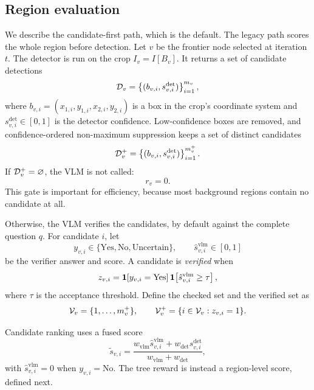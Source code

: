 \subsection{Region evaluation}

We describe the candidate-first path, which is the default. The legacy path
scores the whole region before detection. Let \(v\) be the frontier node
selected at iteration \(t\). The detector is run on the crop
\(I_v = I[B_v]\). It returns a set of candidate detections
\begin{equation}
  \mathcal{D}_v
  = \left\{ (b_{v,i}, s^{\mathrm{det}}_{v,i}) \right\}_{i=1}^{m_v},
\end{equation}
where \(b_{v,i}=(x_{1,i},y_{1,i},x_{2,i},y_{2,i})\) is a box in the crop's
coordinate system and \(s^{\mathrm{det}}_{v,i}\in[0,1]\) is the detector
confidence. Low-confidence boxes are removed, and confidence-ordered non-maximum
suppression keeps a set of distinct candidates
\begin{equation}
  \mathcal{D}^{+}_v
  = \left\{ (b_{v,i}, s^{\mathrm{det}}_{v,i}) \right\}_{i=1}^{m^{+}_v}.
\end{equation}
If \(\mathcal{D}^{+}_v=\varnothing\), the VLM is not called:
\begin{equation}
  r_v = 0.
  \label{eq:empty-region-reward}
\end{equation}
This gate is important for efficiency, because most background regions contain
no candidate at all.

Otherwise, the VLM verifies the candidates, by default against the complete
question \(q\). For candidate \(i\), let
\begin{equation}
  y_{v,i} \in \{\text{Yes}, \text{No}, \text{Uncertain}\},
  \qquad
  \hat{s}^{\mathrm{vlm}}_{v,i} \in [0,1]
\end{equation}
be the verifier answer and score. A candidate is \emph{verified} when
\begin{equation}
  z_{v,i}
  = \mathbf{1}\!\left[y_{v,i}=\text{Yes}\right]
    \mathbf{1}\!\left[\hat{s}^{\mathrm{vlm}}_{v,i} \ge \tau\right],
  \label{eq:verified}
\end{equation}
where \(\tau\) is the acceptance threshold. Define the checked set and the
verified set as
\begin{equation}
  \mathcal{V}_v = \{1,\ldots,m^{+}_v\},
  \qquad
  \mathcal{V}^{+}_v = \{ i \in \mathcal{V}_v : z_{v,i}=1 \}.
\end{equation}

Candidate ranking uses a fused score
\begin{equation}
  \tilde{s}_{v,i}
  = \frac{
      w_{\mathrm{vlm}} \hat{s}^{\mathrm{vlm}}_{v,i}
      + w_{\mathrm{det}} s^{\mathrm{det}}_{v,i}
    }{
      w_{\mathrm{vlm}} + w_{\mathrm{det}}
    },
  \label{eq:candidate-fusion}
\end{equation}
with \(\hat{s}^{\mathrm{vlm}}_{v,i}=0\) when \(y_{v,i}=\text{No}\). The tree
reward is instead a region-level score, defined next.

